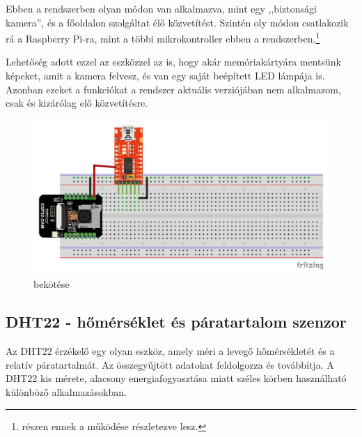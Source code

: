 \documentclass[
]{thesis-ekf}
\theoremstyle{definition}
\theoremstyle{remark}
\begin{document}
	Ebben a rendszerben olyan módon van alkalmazva, mint egy ,,biztonsági kamera'', és a főoldalon szolgáltat élő közvetítést. Szintén oly módon csatlakozik rá a Raspberry Pi-ra, mint a többi mikrokontroller ebben a rendszerben.\footnote{\label{later-expl-fn} részen ennek a működése részletezve lesz.}
	
	Lehetőség adott ezzel az eszközzel az is, hogy akár memóriakártyára mentsünk képeket, amit a kamera felvesz, és van egy saját beépített LED lámpája is. Azonban ezeket a funkciókat a rendszer aktuális verziójában nem alkalmazom, csak és kizárólag elő közvetítésre.
	
	\begin{figure}[ht!]
		\centering
		\includegraphics[width=1\textwidth]{./src/schematics/ESP32 CAM schematics}
		\caption{ bekötése}
		\label{esp32-cam-schematics}
	\end{figure}	
	
	\subsection{DHT22 - hőmérséklet és páratartalom szenzor}
	
	Az DHT22 érzékelő egy olyan eszköz, amely méri a levegő hőmérsékletét és a relatív  páratartalmát. Az összegyűjtött adatokat feldolgozza és továbbítja. A DHT22 kis mérete, alacsony energiafogyasztása miatt széles körben használható különböző alkalmazásokban.\cite{dht22}
	
\end{document}
